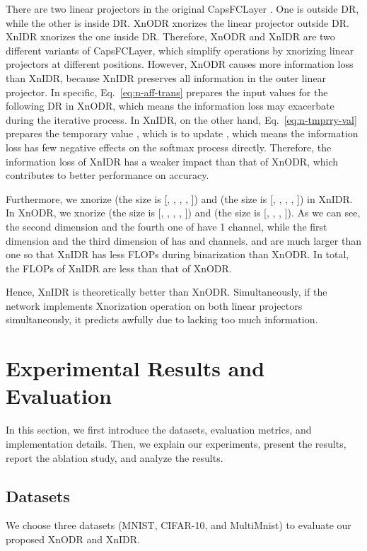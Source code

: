 \documentclass[sn-mathphys,iicol,Numbered]{sn-jnl}
\begin{document}
There are two linear projectors in the original CapsFCLayer \citep{A1_caps}. One is outside DR, while the other is inside DR. XnODR xnorizes the linear projector outside DR. XnIDR xnorizes the one inside DR. Therefore, XnODR and XnIDR are two different variants of CapsFCLayer, which simplify operations by xnorizing linear projectors at different positions. However, XnODR causes more information loss than XnIDR, because XnIDR preserves all information in the outer linear projector. In specific, Eq.~\ref{eq:n-aff-trans} prepares the input values for the following DR in XnODR, which means the information loss may exacerbate during the iterative process. In XnIDR, on the other hand, Eq.~\ref{eq:n-tmprry-val} prepares the temporary value , which is to update , which means the information loss has few negative effects on the softmax process directly. Therefore, the information loss of XnIDR has a weaker impact than that of XnODR, which contributes to better performance on accuracy.

Furthermore, we xnorize  (the size is [, , , , ]) and  (the size is [, , , , ]) in XnIDR. In XnODR, we xnorize  (the size is [, , , , ]) and  (the size is [, , , ]). As we can see, the second dimension and the fourth one of  have 1 channel, while the first dimension and the third dimension of  has  and  channels.  and  are much larger than one so that XnIDR has less FLOPs during binarization than XnODR. In total, the FLOPs of XnIDR are less than that of XnODR.

Hence, XnIDR is theoretically better than XnODR. Simultaneously, if the network implements Xnorization operation on both linear projectors simultaneously, it predicts awfully due to lacking too much information.

\vspace{-0.2cm}
\section{Experimental Results and Evaluation} \label{sec:4}

In this section, we first introduce the datasets, evaluation metrics, and implementation details. Then, we explain our experiments, present the results, report the ablation study, and analyze the results.

\subsection{Datasets}

We choose three datasets (MNIST, CIFAR-10, and MultiMnist) to evaluate our proposed XnODR and XnIDR. 
\end{document}
